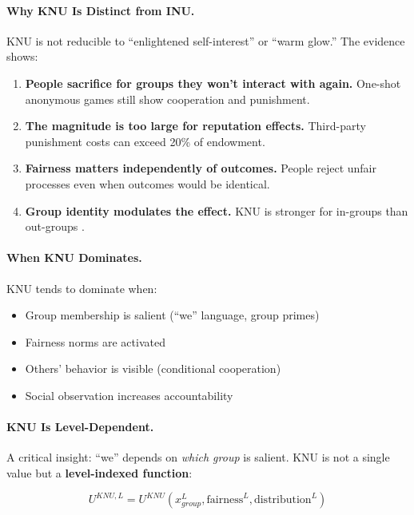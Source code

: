 \paragraph{Why KNU Is Distinct from INU.}
KNU is not reducible to ``enlightened self-interest'' or ``warm glow.''
The evidence shows:

\begin{enumerate}
\item \textbf{People sacrifice for groups they won't interact with again.}
One-shot anonymous games still show cooperation and punishment.

\item \textbf{The magnitude is too large for reputation effects.}
Third-party punishment costs can exceed 20\% of endowment.

\item \textbf{Fairness matters independently of outcomes.}
People reject unfair processes even when outcomes would be identical.

\item \textbf{Group identity modulates the effect.}
KNU is stronger for in-groups than out-groups \citep{chen2009group}.
\end{enumerate}

\paragraph{When KNU Dominates.}
KNU tends to dominate when:
\begin{itemize}
\item Group membership is salient (``we'' language, group primes)
\item Fairness norms are activated
\item Others' behavior is visible (conditional cooperation)
\item Social observation increases accountability
\end{itemize}

\paragraph{KNU Is Level-Dependent.}
A critical insight: ``we'' depends on \emph{which group} is salient.
KNU is not a single value but a \textbf{level-indexed function}:

\begin{equation}
U^{KNU,L} = U^{KNU}(x_{group}^L, \text{fairness}^L, \text{distribution}^L)
\label{eq:knu-level}
\end{equation}

